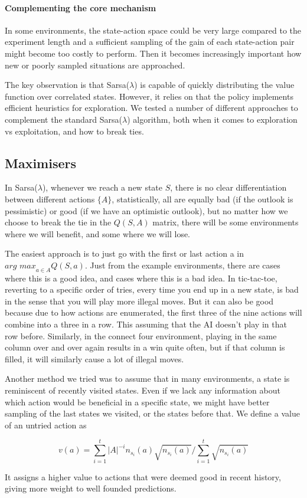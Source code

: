 \paragraph{Complementing the core mechanism}
In some environments, the state-action space could be very large compared to the
experiment length and a sufficient sampling of the gain of each state-action
pair might become too costly to perform. Then it becomes increasingly important
how new or poorly sampled situations are approached.

The key observation is that Sarsa($\lambda$) is capable of quickly distributing
the value function over correlated states. However, it relies on that the policy
implements efficient heuristics for exploration. We tested a number of different
approaches to complement the standard Sarsa($\lambda$) algorithm, both when it
comes to exploration vs exploitation, and how to break ties. 

\subsection{Maximisers}
In Sarsa($\lambda$), whenever we reach a new state $S$, there is no clear
differentiation between different actions $\{A\}$, statistically, all are
equally bad (if the outlook is pessimistic) or good (if we have an optimistic
outlook), but no matter how we choose to break the tie in the $Q(S,A)$ matrix,
there will be some environments where we will benefit, and some where we will
lose.

The easiest approach is to just go with the first or last action a in $\textit{arg
    max}_{a \in A} Q(S,a)$. Just from the example environments, there
are cases where this is a good idea, and cases where this is a bad idea. In tic-tac-toe, reverting to a specific order of tries, every time you end up in a new
state, is bad in the sense that you will play more illegal moves. But it can also
be good because due to how actions are enumerated, the first three of the nine
actions will combine into a three in a row. This assuming that the AI doesn't play in
that row before. Similarly, in the connect four environment, playing in the
same column over and over again results in a win quite often, but if that column
is filled, it will similarly cause a lot of illegal moves.

Another method we tried was to assume that in many environments, a state is
reminiscent of recently visited states. Even if we lack any information about
which action would be beneficial in a specific state, we might have better
sampling of the last states we visited, or the states before that. We define a value of an untried action as

\begin{equation}
    v(a) = \sum_{i=1}^{t} \vert{A}\vert^{-i} n_{s_i}(a)
    \sqrt{n_{s_i}(a)}\Big/\sum_{i=1}^{t} \sqrt{n_{s_i}(a)}
\end{equation}

It assigns a higher value to actions that were deemed good in recent history,
giving more weight to well founded predictions.